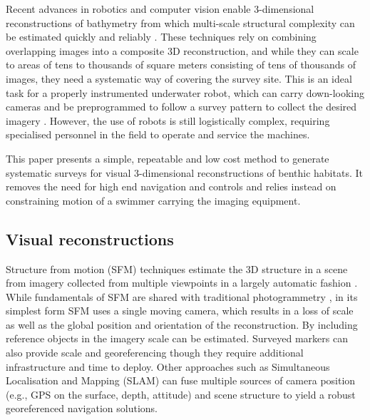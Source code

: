 Recent advances in robotics and computer vision enable 3-dimensional reconstructions of bathymetry from which multi-scale structural complexity can be estimated quickly and reliably \cite{Friedman_2012}. These techniques rely on combining overlapping images into a composite 3D reconstruction, and while they can scale to areas of tens to thousands of square meters consisting of tens of thousands of images, they need a systematic way of covering the survey site. This is an ideal task for a properly instrumented underwater robot, which can carry down-looking cameras and be preprogrammed to follow a survey pattern to collect the desired imagery \cite{Williams_2012}. However, the use of robots is still logistically complex, requiring specialised personnel in the field to operate and service the machines. 

This paper presents a simple, repeatable and low cost method to generate systematic surveys for visual 3-dimensional reconstructions of benthic habitats. It removes the need for high end navigation and controls and relies instead on constraining motion of a swimmer carrying the imaging equipment. 

\subsection{Visual reconstructions} \label{sec:VisRec}

Structure from motion (SFM) techniques estimate the 3D structure in a scene from imagery collected from multiple viewpoints in a largely automatic fashion \cite{Hartley_2004}. While fundamentals of SFM are shared with traditional photogrammetry \cite{Jones_1982}, in its simplest form SFM uses a single moving camera, which results in a loss of scale as well as the global position and orientation of the reconstruction. By including reference objects in the imagery scale can be estimated. Surveyed markers can also provide scale and georeferencing though they require additional infrastructure and time to deploy. %
Other approaches such as Simultaneous Localisation and Mapping (SLAM) \cite{Thrun_2008} can fuse multiple sources of camera position (e.g., GPS on the surface, depth, attitude) and scene structure to yield a robust georeferenced navigation solutions.

